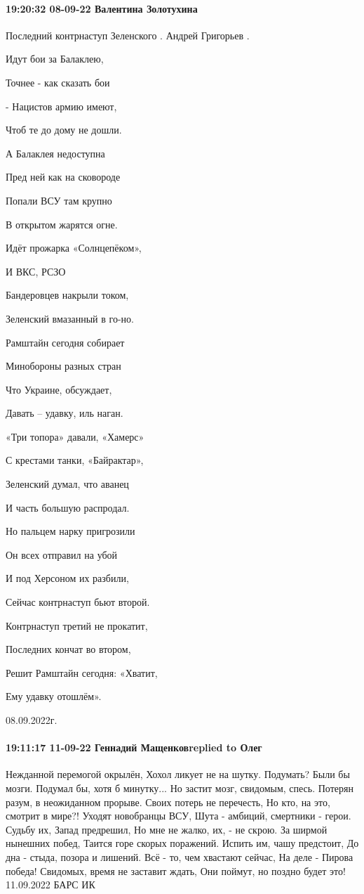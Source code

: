 \paragraph{19:20:32 08-09-22 Валентина Золотухина}

Последний контрнаступ Зеленского . Андрей Григорьев .

Идут бои за Балаклею,

Точнее - как сказать бои

- Нацистов армию имеют,

Чтоб те до дому не дошли.

А Балаклея недоступна

Пред ней как на сковороде

Попали ВСУ там крупно

В открытом жарятся огне.

Идёт прожарка «Солнцепёком»,

И ВКС, РСЗО

Бандеровцев накрыли током,

Зеленский вмазанный в го-но.

Рамштайн сегодня собирает

Минобороны разных стран

Что Украине, обсуждает,

Давать – удавку, иль наган.

«Три топора» давали, «Хамерс»

С крестами танки, «Байрактар»,

Зеленский думал, что аванец

И часть большую распродал.

Но пальцем нарку пригрозили

Он всех отправил на убой

И под Херсоном их разбили,

Сейчас контрнаступ бьют второй.

Контрнаступ третий не прокатит,

Последних кончат во втором,

Решит Рамштайн сегодня: «Хватит,

Ему удавку отошлём».

08.09.2022г.


\paragraph{19:11:17 11-09-22 Геннадий Мащенковreplied to Олег}

Нежданной перемогой окрылён,
Хохол ликует не на шутку.
Подумать? Были бы мозги.
Подумал бы, хотя б минутку...
Но застит мозг, свидомым, спесь.
Потерян разум, в неожиданном прорыве.
Своих потерь не перечесть,
Но кто, на это, смотрит в мире?!
Уходят новобранцы ВСУ,
Шута - амбиций, смертники - герои.
Судьбу их, Запад предрешил,
Но мне не жалко, их, - не скрою.
За ширмой нынешних побед,
Таится горе скорых поражений.
Испить им, чашу предстоит,
До дна - стыда, позора и лишений.
Всё - то, чем хвастают сейчас,
На деле - Пирова победа!
Свидомых, время не заставит ждать,
Они поймут, но поздно будет это!
11.09.2022 БАРС ИК
